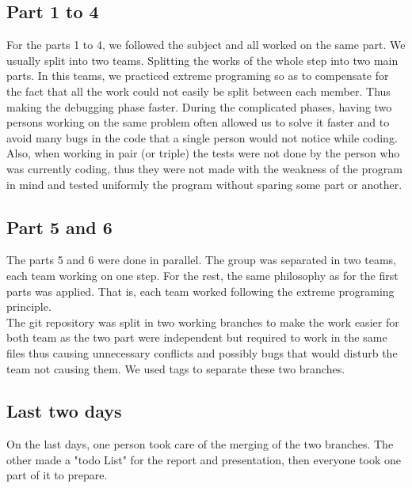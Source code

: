 \subsection{Part 1 to 4}

For the parts 1 to 4, we followed the subject and all worked on the same part.
We usually split into two teams.  Splitting the works of the whole step into
two main parts. In this teams, we practiced extreme programing so as to
compensate for the fact that all the work could not easily be split between
each member. Thus making the debugging phase faster. During the complicated
phases, having two persons working on the same problem often allowed us to
solve it faster and to avoid many bugs in the code that a single person would
not notice while coding.\\
Also, when working in pair (or triple) the tests were not done by the person
who was currently coding, thus they were not made with the weakness of the
program in mind and tested uniformly the program without sparing some part or
another.

\subsection{Part 5 and 6}

The parts 5 and 6 were done in parallel. The group was separated in two teams,
each team working on one step.  For the rest, the same philosophy as for the
first parts was applied. That is, each team worked following the extreme
programing principle.\\
The git repository was split in two working branches to make the work easier
for both team as the two part were independent but required to work in the same
files thus causing unnecessary conflicts and possibly bugs that would disturb
the team not causing them. We used tags to separate these two branches.

\subsection{Last two days}

On the last days, one person took care of the merging of the two branches. The
other made a "todo List" for the report and presentation, then everyone took
one part of it to prepare. 

